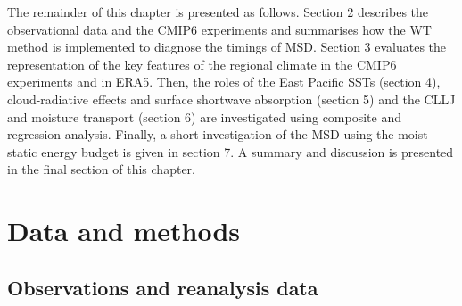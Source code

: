 
 
The remainder of this chapter is presented as follows. Section 2 describes the observational data and the CMIP6 experiments and summarises how the WT method is implemented to diagnose the timings of MSD. Section 3 evaluates the representation of the key features of the regional climate in the CMIP6 experiments and in ERA5.
Then, the roles of the East Pacific SSTs (section 4), cloud-radiative effects and surface shortwave absorption (section 5) and the CLLJ and moisture transport (section 6) are investigated using composite and regression analysis. Finally, a short investigation of the MSD using the moist static energy budget is given in section 7. A summary and discussion is presented in the final section of this chapter. 
  







\section{Data and methods}

\subsection{Observations and reanalysis data}

